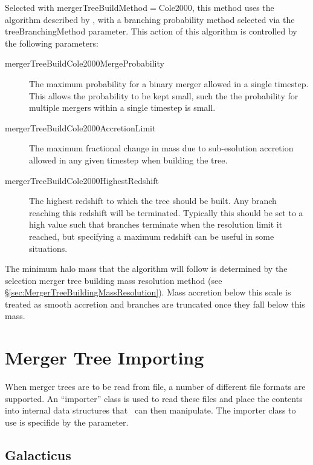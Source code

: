 Selected with {\normalfont \ttfamily mergerTreeBuildMethod}$=${\normalfont \ttfamily Cole2000}, this method uses the algorithm described by \cite{cole_hierarchical_2000}, with a branching probability method selected via the {\normalfont \ttfamily treeBranchingMethod} parameter. This action of this algorithm is controlled by the following parameters:
\begin{description}
 \item [{\normalfont \ttfamily mergerTreeBuildCole2000MergeProbability}] The maximum probability for a binary merger allowed in a single timestep. This allows the probability to be kept small, such the the probability for multiple mergers within a single timestep is small.
 \item [{\normalfont \ttfamily mergerTreeBuildCole2000AccretionLimit}] The maximum fractional change in mass due to sub-esolution accretion allowed in any given timestep when building the tree.
 \item [{\normalfont \ttfamily mergerTreeBuildCole2000HighestRedshift}] The highest redshift to which the tree should be built. Any branch reaching this redshift will be terminated. Typically this should be set to a high value such that branches terminate when the resolution limit it reached, but specifying a maximum redshift can be useful in some situations.
\end{description}
The minimum halo mass that the algorithm will follow is determined by the selection merger tree building mass resolution method (see \S\ref{sec:MergerTreeBuildingMassResolution}). Mass accretion below this scale is treated as smooth accretion and branches are truncated once they fall below this mass.

\section{Merger Tree Importing}\label{sec:MergerTreeImporters}

When merger trees are to be read from file, a number of different file formats are supported. An ``importer'' class is used to read these files and place the contents into internal data structures that \glc\ can then manipulate. The importer class to use is specifide by the {\normalfont \ttfamily [mergerTreeImporterMethod]} parameter.

\subsection{Galacticus}\label{phys:mergerTreeImporter:mergerTreeImporterGalacticus}

